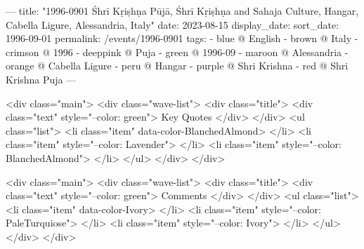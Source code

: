 ---
title: "1996-0901 Śhrī Kṛiṣhṇa Pūjā, Śhrī Kṛiṣhṇa and Sahaja Culture, Hangar, Cabella Ligure, Alessandria, Italy"
date: 2023-08-15
display_date: 
sort_date: 1996-09-01
permalink: /events/1996-0901
tags:
  - blue @ English
  - brown @ Italy
  - crimson @ 1996
  - deeppink @ Puja
  - green @ 1996-09
  - maroon @ Alessandria
  - orange @ Cabella Ligure
  - peru @ Hangar
  - purple @ Shri Krishna
  - red @ Shri Krishna Puja
---

<div class="main">
  <div class="wave-list">
    <div class="title">
      <div class="text" style="--color: green">
        Key Quotes
      </div>
    </div>
    <ul class="list">
        <li class="item" data-color-BlanchedAlmond>
        </li>
        <li class="item" style="--color: Lavender">
        </li>
        <li class="item" style="--color: BlanchedAlmond">
        </li>
      </ul>
  </div>
</div>

<div class="main">
  <div class="wave-list">
    <div class="title">
      <div class="text" style="--color: green">
        Comments
      </div>
    </div>
    <ul class="list">
        <li class="item" data-color-Ivory>
        </li>
        <li class="item" style="--color: PaleTurquiose">
        </li>
        <li class="item" style="--color: Ivory">
        </li>
      </ul>
  </div>
</div>